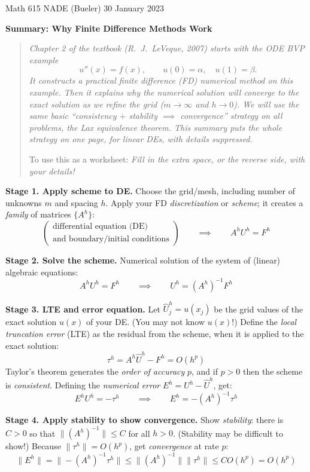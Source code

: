 \documentclass[11pt]{amsart}
\newcommand{\prob}[1]{\bigskip\noindent\textbf{#1.}\quad }
\begin{document}
\scriptsize \noindent Math 615 NADE (Bueler) \hfill 30 January 2023 \quad {}
\normalsize\medskip

\Large\centerline{\textbf{Summary: Why Finite Difference Methods Work}}
\medskip
\normalsize

\thispagestyle{empty}
\begin{quote}
\emph{Chapter 2 of the textbook (R.~J.~LeVeque, 2007) starts with the ODE BVP example}
	$$u''(x)=f(x), \qquad u(0)=\alpha, \quad u(1) = \beta.$$
\emph{It constructs a practical finite difference (FD) numerical method on this example.  Then it explains why the numerical solution will converge to the exact solution as we refine the grid ($m\to\infty$ and $h\to 0$).  We will use the same basic ``consistency $+$ stability $\implies$ convergence'' strategy on all problems, the \emph{Lax equivalence theorem}.  This summary puts the whole strategy on one page, for linear DEs, with details suppressed.}

\medskip
\noindent To use this as a worksheet: \emph{Fill in the extra space, or the reverse side, with your details!}
\end{quote}

\medskip

\prob{Stage 1.  Apply scheme to DE}  Choose the grid/mesh, including number of unknowns $m$ and spacing $h$.  Apply your FD \emph{discretization} or \emph{scheme}; it creates a \emph{family} of matrices $\{A^h\}$:
   $$\begin{pmatrix} \text{differential equation (DE)} \\ \text{and boundary/initial conditions} \end{pmatrix} \qquad \implies \qquad A^h U^h = F^h$$

\vfill
\prob{Stage 2.  Solve the scheme}  Numerical solution of the system of (linear) algebraic equations:
   $$A^h U^h = F^h \qquad \implies \qquad U^h = (A^h)^{-1} F^h$$

\vfill
\prob{Stage 3.  LTE and error equation}  Let $\hat U^h_j = u(x_j)$ be the grid values of the exact solution $u(x)$ of your DE.  (You may not know $u(x)$!)  Define the \emph{local truncation error} (LTE) as the residual from the scheme, when it is applied to the exact solution:
   $$\tau^h = A^h \hat U^h - F^h = O(h^p)$$
Taylor's theorem generates the \emph{order of accuracy} $p$, and if $p>0$ then the scheme is \emph{consistent}.  Defining the \emph{numerical error} $E^h = U^h - \hat U^h$, get:
   $$E^h U^h = -\tau^h \qquad \implies \qquad E^h = - (A^h)^{-1} \tau^h$$

\vfill
\prob{Stage 4.  Apply stability to show convergence}  Show \emph{stability}: there is $C>0$ so that $\|(A^h)^{-1}\| \le C$ for all $h>0$.  (Stability may be difficult to show!)  Because $\|\tau^h\| = O(h^p)$, get \emph{convergence} at rate $p$:
	$$\|E^h\| = \|- (A^h)^{-1} \tau^h\| \le \|(A^h)^{-1}\| \|\tau^h\| \le C O(h^p) = O(h^p)$$

\vfill
\end{document}
